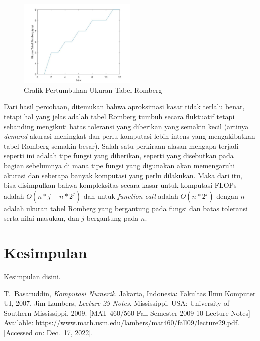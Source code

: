 \documentclass[journal,12pt,onecolumn,a4paper]{IEEEtran}
\begin{document}
\begin{figure}[h]
	\centering
	\includegraphics[width=0.5\textwidth]{rombergSize}
	\caption{Grafik Pertumbuhan Ukuran Tabel Romberg}
	\label{fig:rombergTableGraph}
\end{figure}
Dari hasil percobaan, ditemukan bahwa aproksimasi kasar tidak terlalu benar, tetapi hal yang jelas adalah tabel Romberg tumbuh secara fluktuatif tetapi sebanding mengikuti batas toleransi yang diberikan yang semakin kecil (artinya \emph{demand} akurasi meningkat dan perlu komputasi lebih intens yang mengakibatkan tabel Romberg semakin besar).
Salah satu perkiraan alasan mengapa terjadi seperti ini adalah tipe fungsi yang diberikan, seperti yang disebutkan pada bagian sebelumnya di mana tipe fungsi yang digunakan akan memengaruhi akurasi dan seberapa banyak komputasi yang perlu dilakukan.
Maka dari itu, bisa disimpulkan bahwa kompleksitas secara kasar untuk komputasi FLOPs adalah \(O(n*j + n*2^j)\) dan untuk \emph{function call} adalah \(O(n*2^j)\) dengan \(n\) adalah ukuran tabel Romberg yang bergantung pada fungsi dan batas toleransi serta nilai masukan, dan \(j\) bergantung pada \(n\).

\section{Kesimpulan}
Kesimpulan disini.


\begin{thebibliography}{1}
	T.~Basaruddin, \emph{Komputasi Numerik}. Jakarta, Indonesia: Fakultas Ilmu Komputer UI, 2007.
	Jim Lambers, \emph{Lecture 29 Notes}.
	Mississippi, USA: University of Southern Mississippi, 2009. [MAT 460/560 Fall Semester 2009-10 Lecture Notes] Available: \url{https://www.math.usm.edu/lambers/mat460/fall09/lecture29.pdf}. [Accessed on: Dec.~17, 2022].
\end{thebibliography}
\end{document}
